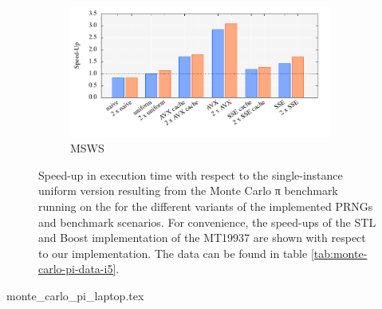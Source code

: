 \documentclass{stdlocal}
\begin{document}
\begin{figure}[H]
    \begin{subfigure}[b]{\textwidth}
      \center
      \includegraphics[width=0.95\textwidth]{plots/monte_carlo_pi_laptop_msws.pdf}
      \caption{MSWS}
    \end{subfigure}
    \caption[Monte Carlo π Benchmark Speed-Up for ]{%
      Speed-up in execution time with respect to the single-instance uniform version resulting from the Monte Carlo π benchmark running on the  for the different variants of the implemented PRNGs and benchmark scenarios.
      For convenience, the speed-ups of the STL and Boost implementation of the MT19937 are shown with respect to our implementation.
      The data can be found in table \ref{tab:monte-carlo-pi-data-i5}.
    }
    \label{fig:monte-carlo-pi-speedup-i5}
  \end{figure}

  \begin{table}[H]
    \center
    \caption[Monte Carlo π Benchmark Data for ]{%
      Results achieved by running the Monte Carlo π Benchmark on the  with all implemented variants of given PRNGs and benchmark scenarios.
      While running the benchmark, $10^{8}$ samples in the unit square were used to estimate the value of π.
      It was ensured that the estimation error was small enough according to the calculation at the end of section \ref{sub:monte_carlo_integration}.
      During the execution, there were no cache or branch misses.
      The values for cycles, instructions, and IPCs were averaged over the number of samples in the unit square.
    }
    \label{tab:monte-carlo-pi-data-i5}
    \footnotesize
    \renewcommand{\arraystretch}{1.2}
    {monte_carlo_pi_laptop.tex}
  \end{table}
\end{document}
